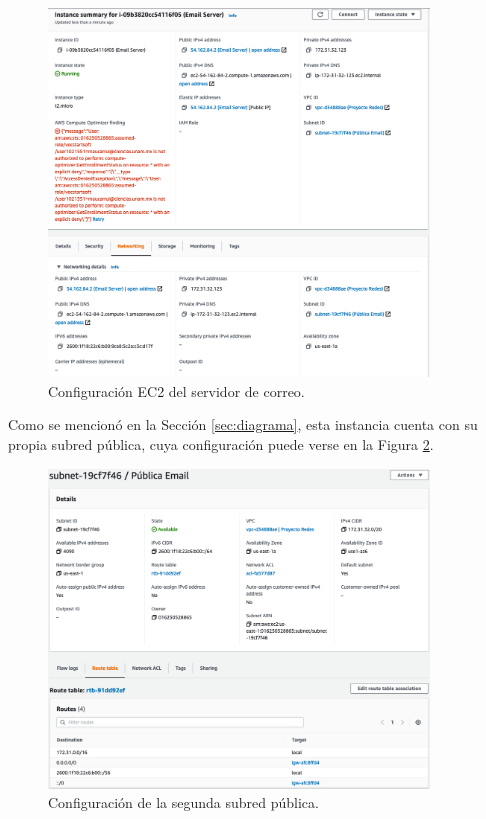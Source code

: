 \documentclass{article}
\begin{document}
\begin{figure}[H]
  \centering
  \includegraphics[width=0.9\textwidth]{email/instancia}
  \caption{Configuraci\'on EC2 del servidor de correo.}
  \label{fig:email-instancia}
\end{figure}

Como se mencion\'o en la Secci\'on \ref{sec:diagrama},
esta instancia cuenta con su propia subred p\'ublica,
cuya configuraci\'on puede verse en la Figura
\ref{fig:email-subred}.

\begin{figure}[H]
  \centering
  \includegraphics[width=0.9\textwidth]{email/subred}
  \caption{Configuraci\'on de la segunda subred p\'ublica.}
  \label{fig:email-subred}
\end{figure}
\end{document}
